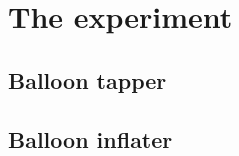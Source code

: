 \section{The experiment}
\lipsum[7-9]

\subsection{Balloon tapper}
\lipsum[7-15]

\subsection{Balloon inflater}
\lipsum[7-15]